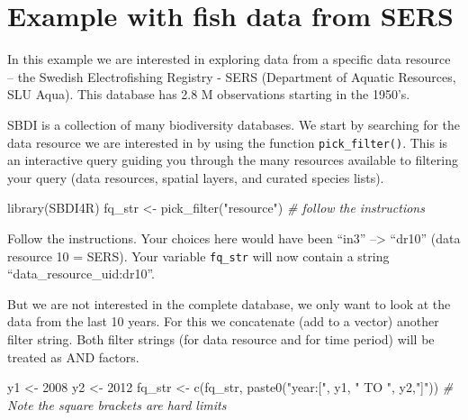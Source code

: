 \documentclass[
  10pt,
]{article}
\newenvironment{Shaded}{\begin{snugshade}}{\end{snugshade}}
\newcommand{\CommentTok}[1]{\textcolor[rgb]{0.56,0.35,0.01}{\textit{#1}}}
\newcommand{\DecValTok}[1]{\textcolor[rgb]{0.00,0.00,0.81}{#1}}
\newcommand{\FunctionTok}[1]{\textcolor[rgb]{0.00,0.00,0.00}{#1}}
\newcommand{\NormalTok}[1]{#1}
\newcommand{\OtherTok}[1]{\textcolor[rgb]{0.56,0.35,0.01}{#1}}
\newcommand{\StringTok}[1]{\textcolor[rgb]{0.31,0.60,0.02}{#1}}
\begin{document}
\hypertarget{example-with-fish-data-from-sers}{%
\section{Example with fish data from SERS}\label{example-with-fish-data-from-sers}}

In this example we are interested in exploring data from a specific data resource -- the Swedish Electrofishing Registry - SERS (Department of Aquatic Resources, SLU Aqua). This database has 2.8 M observations starting in the 1950's.

SBDI is a collection of many biodiversity databases. We start by searching for the data resource we are interested in by using the function \texttt{pick\_filter()}. This is an interactive query guiding you through the many resources available to filtering your query (data resources, spatial layers, and curated species lists).

\begin{Shaded}
\begin{Highlighting}[]
\FunctionTok{library}\NormalTok{(SBDI4R)}
\NormalTok{fq\_str }\OtherTok{\textless{}{-}} \FunctionTok{pick\_filter}\NormalTok{(}\StringTok{"resource"}\NormalTok{) }
\CommentTok{\# follow the instructions }
\end{Highlighting}
\end{Shaded}

Follow the instructions. Your choices here would have been ``in3'' --\textgreater{} ``dr10'' (data resource 10 = SERS). Your variable \texttt{fq\_str} will now contain a string ``data\_resource\_uid:dr10''.

But we are not interested in the complete database, we only want to look at the data from the last 10 years. For this we concatenate (add to a vector) another filter string. Both filter strings (for data resource and for time period) will be treated as AND factors.

\begin{Shaded}
\begin{Highlighting}[]
\NormalTok{y1 }\OtherTok{\textless{}{-}} \DecValTok{2008}
\NormalTok{y2 }\OtherTok{\textless{}{-}} \DecValTok{2012}
\NormalTok{fq\_str }\OtherTok{\textless{}{-}} \FunctionTok{c}\NormalTok{(fq\_str, }\FunctionTok{paste0}\NormalTok{(}\StringTok{"year:["}\NormalTok{, y1, }\StringTok{" TO "}\NormalTok{, y2,}\StringTok{"]"}\NormalTok{))}
\CommentTok{\# Note the square brackets are hard limits}
\end{Highlighting}
\end{Shaded}
\end{document}
